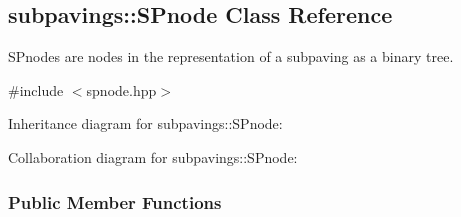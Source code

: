 \hypertarget{classsubpavings_1_1SPnode}{\subsection{subpavings\-:\-:\-S\-Pnode \-Class \-Reference}
\label{classsubpavings_1_1SPnode}
}


\-S\-Pnodes are nodes in the representation of a subpaving as a binary tree.  




{\ttfamily \#include $<$spnode.\-hpp$>$}



\-Inheritance diagram for subpavings\-:\-:\-S\-Pnode\-:


\-Collaboration diagram for subpavings\-:\-:\-S\-Pnode\-:
\subsubsection*{\-Public \-Member \-Functions}
